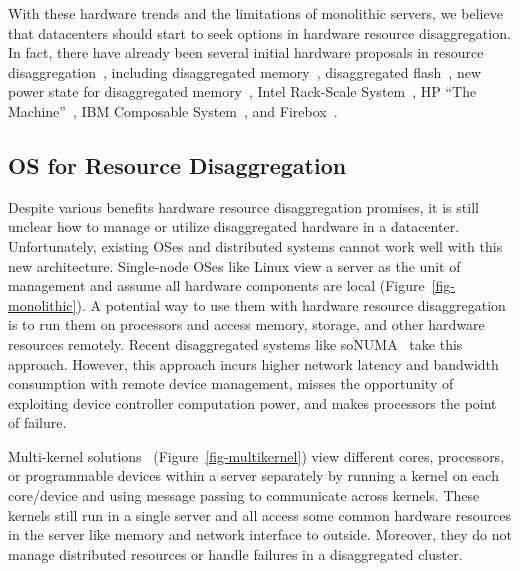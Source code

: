\documentclass[10pt,times,twocolumn]{z2-article}
\begin{document}
With these hardware trends and the limitations of monolithic servers,
we believe that datacenters should start to seek options in hardware resource disaggregation.
In fact, there have already been several initial hardware proposals in resource disaggregation~\cite{OCP},
including disaggregated memory~\cite{Lim09-disaggregate,Scaleout-numa}, 
disaggregated flash~\cite{FlashDisaggregation,ReFlex},
new power state for disaggregated memory~\cite{Nitu18-EUROSYS},
Intel Rack-Scale System~\cite{IntelRackScale}, 
HP ``The Machine''~\cite{HP-TheMachine,HP-MemoryOS}, 
IBM Composable System~\cite{IBM-Composable},
and Firebox~\cite{FireBox-FASTKeynote}.


\subsection{OS for Resource Disaggregation}
Despite various benefits hardware resource disaggregation promises, 
it is still unclear how to manage or utilize disaggregated hardware in a datacenter.
Unfortunately, existing OSes and distributed systems cannot work well with this new architecture.
Single-node OSes like Linux view a server as the unit of management and assume all hardware components are local (Figure~\ref{fig-monolithic}).
A potential way to use them with hardware resource disaggregation is to run them on processors
and access memory, storage, and other hardware resources remotely.
Recent disaggregated systems like soNUMA~\cite{Scaleout-numa} take this approach.
However, this approach incurs higher network latency and bandwidth consumption with remote device management,
misses the opportunity of exploiting device controller computation power,
and makes processors the point of failure.

Multi-kernel solutions~\cite{Baumann-SOSP09,Barrelfish-DC,Helios-SOSP,fos-SOCC,Hive-SOSP} (Figure~\ref{fig-multikernel}) 
view different cores, processors, or programmable devices within a server separately 
by running a kernel on each core/device and using message passing to communicate across kernels.
These kernels still run in a single server and all access some common hardware resources in the server like memory and network interface to outside.
Moreover, they do not manage distributed resources or handle failures in a disaggregated cluster. 
\end{document}
